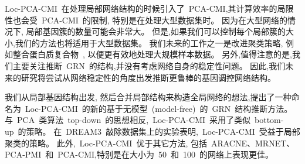 Loc-PCA-CMI~在处理局部网络结构的时候引入了~PCA-CMI,其计算效率的局限性也会受~PCA-CMI~的限制,
特别是在处理大型数据集时。
因为在大型网络的情况下, 局部基因簇的数量可能会非常大。
但是,如果我们可以控制每个局部簇的大小,我们的方法也将适用于大型数据集。
我们未来的工作之一是改进聚类策略,
例如整合蛋白质复合物~\cite{li2017identification, li2017dynetviewer},
以便更有效地处理大规模样本数据。
另外,值得注意的是,我们主要关注推断~GRN~的结构,并没有考虑网络自身的稳定性问题。
因此,我们未来的研究将尝试从网络稳定性的角度出发推断更鲁棒的基因调控网络结构。

我们从局部基因结构出发, 然后合并局部结构来构造全局网络的想法,提出了一种命名为~Loc-PCA-CMI~的新的基于无模型~(model-free)~的~GRN~结构推断方法。
与~PCA~类算法~top-down~的思想相反,~Loc-PCA-CMI~采用了类似~bottom-up~的策略。
在~DREAM3~敲除数据集上的实验表明,~Loc-PCA-CMI~受益于局部聚类的策略。
此外,~Loc-PCA-CMI~优于其它方法,
包括~ARACNE、MRNET、PCA-PMI~和~PCA-CMI,特别是在大小为~50~和~100~的网络上表现更佳。